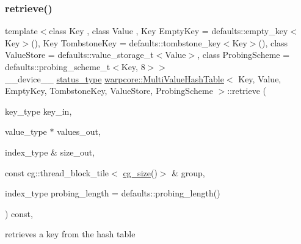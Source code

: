 \subsubsection{\texorpdfstring{retrieve()}{retrieve()}\hspace{0.1cm}{\footnotesize\ttfamily [1/2]}}
{\footnotesize\ttfamily template$<$class Key , class Value , Key Empty\+Key = defaults\+::empty\+\_\+key$<$\+Key$>$(), Key Tombstone\+Key = defaults\+::tombstone\+\_\+key$<$\+Key$>$(), class Value\+Store  = defaults\+::value\+\_\+storage\+\_\+t$<$\+Value$>$, class Probing\+Scheme  = defaults\+::probing\+\_\+scheme\+\_\+t$<$\+Key, 8$>$$>$ \\
\+\_\+\+\_\+device\+\_\+\+\_\+ \hyperlink{classwarpcore_1_1Status}{status\+\_\+type} \hyperlink{classwarpcore_1_1MultiValueHashTable}{warpcore\+::\+Multi\+Value\+Hash\+Table}$<$ Key, Value, Empty\+Key, Tombstone\+Key, Value\+Store, Probing\+Scheme $>$\+::retrieve (\begin{DoxyParamCaption}\item[{key\+\_\+type}]{key\+\_\+in,  }\item[{value\+\_\+type $\ast$}]{values\+\_\+out,  }\item[{index\+\_\+type \&}]{size\+\_\+out,  }\item[{const cg\+::thread\+\_\+block\+\_\+tile$<$ \hyperlink{classwarpcore_1_1MultiValueHashTable_a2191f42810234e459bc4ef6e491ec929}{cg\+\_\+size}()$>$ \&}]{group,  }\item[{index\+\_\+type}]{probing\+\_\+length = {\ttfamily defaults\+:\+:probing\+\_\+length()} }\end{DoxyParamCaption}) const\hspace{0.3cm}{\ttfamily [inline]}, {\ttfamily [noexcept]}}



retrieves a key from the hash table 


